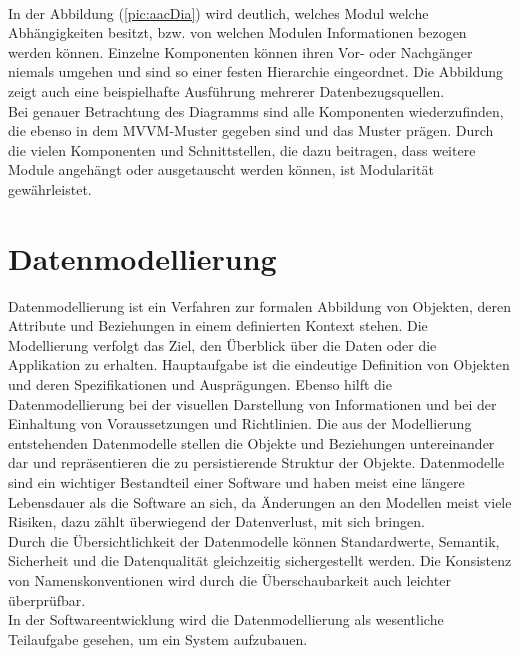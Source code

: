 \\ 
In der Abbildung (\ref{pic:aacDia}) wird deutlich, welches Modul welche Abhängigkeiten besitzt, bzw. von welchen Modulen 
Informationen bezogen werden können. Einzelne Komponenten können ihren Vor- oder Nachgänger niemals umgehen und sind so einer festen 
Hierarchie eingeordnet. Die Abbildung zeigt auch eine beispielhafte Ausführung mehrerer Datenbezugsquellen.
\\ 
Bei genauer Betrachtung des Diagramms sind alle Komponenten wiederzufinden, die ebenso in dem MVVM-Muster gegeben 
sind und das Muster prägen. Durch die vielen Komponenten und Schnittstellen, die dazu beitragen, dass weitere Module angehängt oder 
ausgetauscht werden können, ist Modularität gewährleistet. 

\section{Datenmodellierung}
\label{chap:Datenmodellierung}
Datenmodellierung ist ein Verfahren zur formalen Abbildung von Objekten, deren Attribute und Beziehungen in einem definierten Kontext stehen. 
Die Modellierung verfolgt das Ziel, den Überblick über die Daten oder die Applikation zu erhalten. Hauptaufgabe ist die eindeutige 
Definition von Objekten und deren Spezifikationen und Ausprägungen. Ebenso hilft die Datenmodellierung bei der visuellen Darstellung von 
Informationen und bei der Einhaltung von Voraussetzungen und Richtlinien. 
Die aus der Modellierung entstehenden Datenmodelle stellen die Objekte und Beziehungen untereinander dar und repräsentieren die zu 
persistierende Struktur der Objekte. Datenmodelle sind ein wichtiger Bestandteil einer Software und haben meist eine längere Lebensdauer als 
die Software an sich, da Änderungen an den Modellen meist viele Risiken, dazu zählt überwiegend der Datenverlust, mit sich bringen.
\\ 
\linebreak
Durch die Übersichtlichkeit der Datenmodelle können Standardwerte, Semantik, Sicherheit und die Datenqualität gleichzeitig sichergestellt 
werden. Die Konsistenz von Namenskonventionen wird durch die Überschaubarkeit auch leichter überprüfbar. 
\\ 
In der Softwareentwicklung wird die Datenmodellierung als wesentliche Teilaufgabe gesehen, um ein System aufzubauen. %
